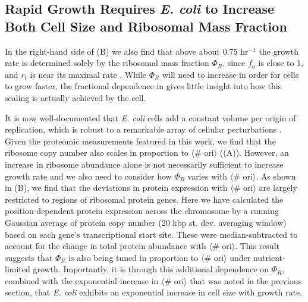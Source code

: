 \subsection{Rapid Growth Requires \textit{E. coli} to Increase Both Cell Size and Ribosomal
Mass Fraction}
In the right-hand side of (B) we also find that above about 0.75
hr$^{-1}$ the growth rate is determined solely by the ribosomal mass fraction
$\Phi_R$, since $f_a$ is close to 1, and $r_t$ is near its maximal rate
\citep{dai2016}. While $\Phi_R$ will need to increase in order for cells to
grow faster, the fractional dependence in 
gives little insight into how this scaling is actually achieved by the cell.

It is now well-documented that \textit{E. coli} cells add a constant volume per
origin of replication, which is robust to a remarkable array of cellular
perturbations \citep{si2017}. Given the proteomic measurements featured in this
work, we find that the ribosome copy number also scales in proportion to
$\langle$\# ori$\rangle$ ((A)). However,  an
increase in ribosome abundance alone is not necessarily sufficient to increase
growth rate and we also need to consider how $\Phi_R$ varies with $\langle$\#
ori$\rangle$. As shown in (B), we find
that the deviations in protein expression with $\langle$\# ori$\rangle$ are
largely restricted to regions of ribosomal protein genes. Here we have calculated the position-dependent
protein expression across the chromosome by a running Gaussian average of
protein copy number (20 kbp st. dev. averaging window) based on each gene's
transcriptional start site. These were median-subtracted to account for the
change in total protein abundance with $\langle$\# ori$\rangle$. This result
suggests that $\Phi_R$ is also being tuned in proportion to $\langle$\#
ori$\rangle$ under nutrient-limited growth. Importantly, it is through this
additional dependence on $\Phi_R$, combined with the exponential increase in
$\langle$\# ori$\rangle$ that was noted in the previous section, that \textit{E. coli}
exhibits an exponential increase in cell size with growth rate.


